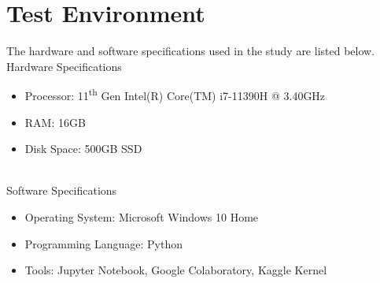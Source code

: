 \section{Test Environment}
The hardware and software specifications used in the study are listed below.
\\
Hardware Specifications
\begin{itemize}[nosep] 
\item Processor: 11\textsuperscript{th} Gen Intel(R) Core(TM) i7-11390H @ 3.40GHz
\item RAM: 16GB
\item Disk Space: 500GB SSD
\end{itemize}
\
\\
Software Specifications
\begin{itemize}[nosep]
\item Operating System: Microsoft Windows 10 Home 
\item Programming Language: Python
\item Tools: Jupyter Notebook, Google Colaboratory, Kaggle Kernel 
\end{itemize}

